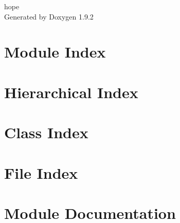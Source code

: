 \documentclass[twoside]{book}
\newcommand{\+}{\discretionary{\mbox{\scriptsize$\hookleftarrow$}}{}{}}
\newcommand{\clearemptydoublepage}{%
    \newpage{\pagestyle{empty}\cleardoublepage}%
  }
\begin{document}
  \raggedbottom
    \hypersetup{pageanchor=false,
                bookmarksnumbered=true,
                pdfencoding=unicode
               }
  \begin{titlepage}
  \vspace*{7cm}
  \begin{center}%
  {\Large hope}\\
  \vspace*{1cm}
  {\large Generated by Doxygen 1.9.2}\\
  \end{center}
  \end{titlepage}
  \clearemptydoublepage
  \tableofcontents
  \clearemptydoublepage
  \hypersetup{pageanchor=true}
\chapter{Module Index}

\chapter{Hierarchical Index}

\chapter{Class Index}

\chapter{File Index}

\chapter{Module Documentation}

\end{document}
